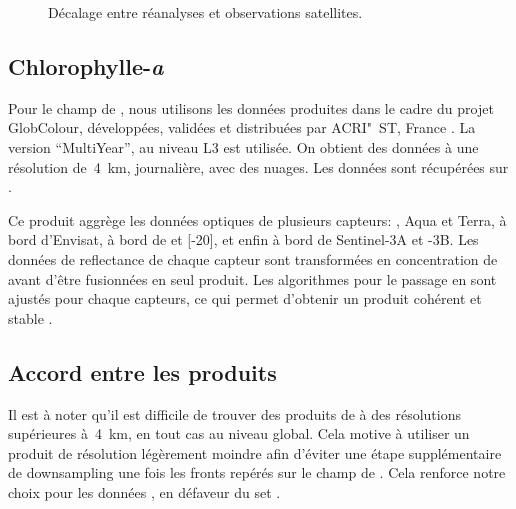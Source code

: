 
\begin{figure}
  \caption{Décalage entre réanalyses et observations satellites.}
  \label{fig:decalage-reanalyses}
\end{figure}

\subsection{Chlorophylle-\emph{a}}
\label{sec:donnees-chl}

Pour le champ de , nous utilisons les données produites dans le cadre du projet GlobColour, développées, validées et distribuées par ACRI"~ST, France \parencite{maritorena_2002}.
La version \enquote{MultiYear}, au niveau L3 est utilisée.
On obtient des données à une résolution de~\qty{4}{\km}, journalière, avec des nuages.
Les données sont récupérées sur .

Ce produit aggrège les données optiques de plusieurs capteurs: ,  Aqua et Terra,  à bord d'Envisat,  à bord de  et [-20], et enfin  à bord de Sentinel-3A et -3B.
Les données de reflectance de chaque capteur sont transformées en concentration de  avant d'être fusionnées en seul produit.
Les algorithmes pour le passage en  sont ajustés pour chaque capteurs, ce qui permet d'obtenir un produit cohérent et stable \parencite{garnesson_2019}.


\subsection{Accord entre les produits}

Il est à noter qu'il est difficile de trouver des produits de  à des résolutions supérieures à~\qty{4}{\km}, en tout cas au niveau global.
Cela motive à utiliser un produit  de résolution légèrement moindre afin d'éviter une étape supplémentaire de downsampling une fois les fronts repérés sur le champ de .
Cela renforce notre choix pour les données , en défaveur du set .

